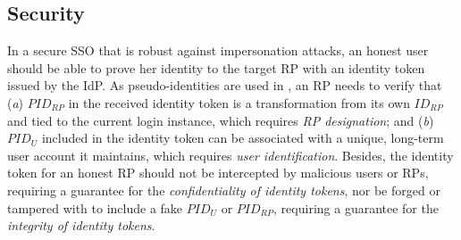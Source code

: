 
\subsection{Security}
\label{analysis-security}

\newc
In a secure SSO that is robust against impersonation attacks, an honest user should be able to prove her identity to the target RP with an identity token issued by the IdP. As pseudo-identities are used in \usso, an RP needs to verify that ({\em a}) $PID_{RP}$ in the received identity token is a transformation from its own $ID_{RP}$ and tied to the current login instance, which requires {\em RP designation}; and ({\em b}) $PID_U$ included in the identity token can be associated with a unique, long-term user account it maintains, which requires {\em user identification}. Besides, the identity token for an honest RP should not be intercepted by malicious users or RPs, requiring a guarantee for the {\em confidentiality of identity tokens}, nor be forged or tampered with to include a fake $PID_U$ or $PID_{RP}$, requiring a guarantee for the {\em integrity of identity tokens}.
\oldc


